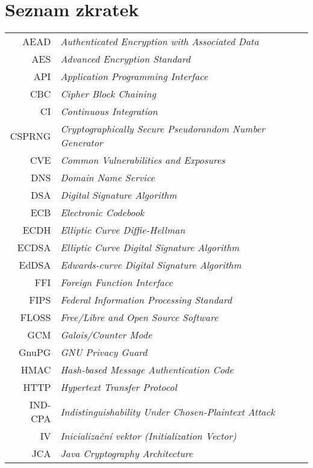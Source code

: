 \documentclass[czech,bachelor,unicode,twoside,hyphens]{ctufit-thesis}
\theoremstyle{plain}
\theoremstyle{definition}
\theoremstyle{remark}
\numberwithin{theorem}{chapter}
\begin{document}
\printabstractpage %

\chapter{Seznam zkratek}
	
\begin{tabular}{rl}
AEAD & \textit{Authenticated Encryption with Associated Data} \\
AES & \textit{Advanced Encryption Standard} \\
API & \textit{Application Programming Interface} \\
CBC & \textit{Cipher Block Chaining} \\
CI & \textit{Continuous Integration} \\
CSPRNG & \textit{Cryptographically Secure Pseudorandom Number Generator} \\
CVE & \textit{Common Vulnerabilities and Exposures} \\
DNS & \textit{Domain Name Service} \\
DSA & \textit{Digital Signature Algorithm} \\
ECB & \textit{Electronic Codebook} \\
ECDH & \textit{Elliptic Curve Diffie-Hellman} \\
ECDSA & \textit{Elliptic Curve Digital Signature Algorithm} \\
EdDSA & \textit{Edwards-curve Digital Signature Algorithm} \\
FFI & \textit{Foreign Function Interface} \\
FIPS & \textit{Federal Information Processing Standard} \\
FLOSS & \textit{Free/Libre and Open Source Software} \\
GCM & \textit{Galois/Counter Mode} \\
GnuPG & \textit{GNU Privacy Guard} \\
HMAC & \textit{Hash-based Message Authentication Code} \\
HTTP & \textit{Hypertext Transfer Protocol} \\
IND-CPA & \textit{Indistinguishability Under Chosen-Plaintext Attack} \\
IV & \textit{Inicializační vektor (Initialization Vector)} \\
JCA & \textit{Java Cryptography Architecture} \\

\end{tabular}
\end{document}
